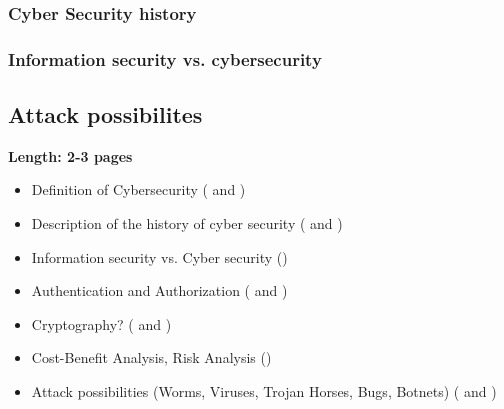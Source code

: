 \subsubsection{Cyber Security history}

\subsubsection{Information security vs. cybersecurity}


\subsection{Attack possibilites}











\textbf{Length: 2-3 pages}
\begin{itemize}
  \item Definition of Cybersecurity (\cite{Bishop2003} and \cite{Bishop2004})
  \item Description of the history of cyber security (\cite{Hansen2016} and \cite{Bishop2004})
  \item Information security vs. Cyber security (\cite{VonSolms2013})
  \item Authentication and Authorization (\cite{Bishop2004} and \cite{Pfleeger2014})
  \item Cryptography? (\cite{Bishop2004} and \cite{Pfleeger2014})
  \item Cost-Benefit Analysis, Risk Analysis (\cite{Bishop2004})
  \item Attack possibilities (Worms, Viruses, Trojan Horses, Bugs, Botnets) (\cite{Bishop2004} and \cite{Pfleeger2014})
\end{itemize}
